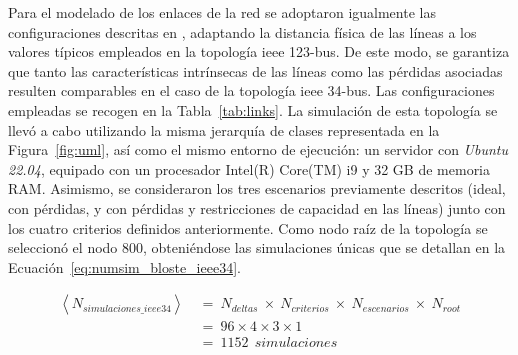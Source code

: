 Para el modelado de los enlaces de la red se adoptaron igualmente las configuraciones descritas en \cite{Schneider17}, adaptando la distancia física de las líneas a los valores típicos empleados en la topología \gls{ieee} 123-bus. De este modo, se garantiza que tanto las características intrínsecas de las líneas como las pérdidas asociadas resulten comparables en el caso de la topología \gls{ieee} 34-bus. Las configuraciones empleadas se recogen en la Tabla~\ref{tab:links}. La simulación de esta topología se llevó a cabo utilizando la misma jerarquía de clases representada en la Figura~\ref{fig:uml}, así como el mismo entorno de ejecución: un servidor con \textit{Ubuntu 22.04}, equipado con un procesador Intel(R) Core(TM) i9 y 32 GB de memoria RAM. Asimismo, se consideraron los tres escenarios previamente descritos (ideal, con pérdidas, y con pérdidas y restricciones de capacidad en las líneas) junto con los cuatro criterios definidos anteriormente. Como nodo raíz de la topología se seleccionó el nodo 800, obteniéndose las simulaciones únicas que se detallan en la Ecuación~\ref{eq:numsim_bloste_ieee34}.


\begin{equation}\label{eq:numsim_bloste_ieee34}
\begin{aligned}
    \left \langle N_{simulaciones\_ieee34} \right \rangle  \: & = \: N_{deltas} \: \times \: N_{criterios} \: \times \:  N_{escenarios} \: \times \: N_{root}\\ 
    \: & = \: 96 \times 4 \times 3 \times 1\\
    \: & = \: 1152 \: \: simulaciones
\end{aligned}    
\end{equation}
\vspace{0.2cm}


